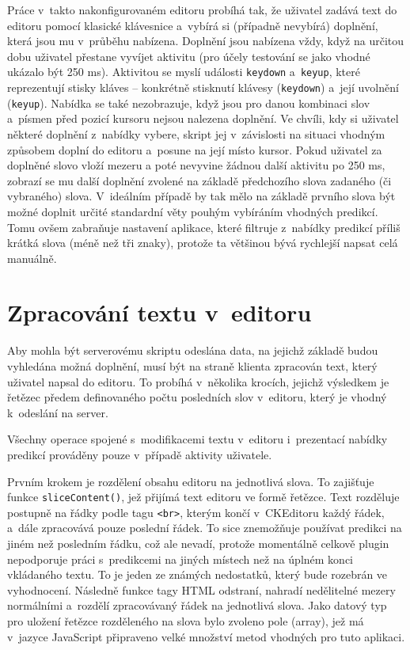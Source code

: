\documentclass[a4paper,11pt,openany]{book} %
\begin{document}
Práce v~takto nakonfigurovaném editoru probíhá tak, že uživatel zadává text do editoru pomocí klasické klávesnice a~vybírá si (případně nevybírá) doplnění, která jsou mu v~průběhu nabízena. Doplnění jsou nabízena vždy, když na určitou dobu uživatel přestane vyvíjet aktivitu (pro účely testování se jako vhodné ukázalo být 250 ms). Aktivitou se myslí události {\tt keydown} a~{\tt keyup}, které reprezentují stisky kláves -- konkrétně stisknutí klávesy ({\tt keydown}) a~její uvolnění ({\tt keyup}). Nabídka se také nezobrazuje, když jsou pro danou kombinaci slov a~písmen před pozicí kursoru nejsou nalezena doplnění. Ve chvíli, kdy si uživatel některé doplnění z~nabídky vybere, skript jej v~závislosti na situaci vhodným způsobem doplní do editoru a~posune na její místo kursor. Pokud uživatel za doplněné slovo vloží mezeru a poté nevyvine žádnou další aktivitu po 250 ms, zobrazí se mu další doplnění zvolené na základě předchozího slova zadaného (či vybraného) slova. V~ideálním případě by tak mělo na základě prvního slova být možné doplnit určité standardní věty pouhým vybíráním vhodných predikcí. Tomu ovšem zabraňuje nastavení aplikace, které filtruje z~nabídky predikcí příliš krátká slova (méně než tři znaky), protože ta většinou bývá rychlejší napsat celá manuálně.

\section{Zpracování textu v~editoru}

Aby mohla být serverovému skriptu odeslána data, na jejichž základě budou vyhledána možná doplnění, musí být na straně klienta zpracován text, který uživatel napsal do editoru. To probíhá v~několika krocích, jejichž výsledkem je řetězec předem definovaného počtu posledních slov v~editoru, který je vhodný k~odeslání na server.

Všechny operace spojené s~modifikacemi textu v~editoru i~prezentací nabídky predikcí prováděny pouze v~případě aktivity uživatele. 

Prvním krokem je rozdělení obsahu editoru na jednotlivá slova. To zajišťuje funkce {\tt sliceContent()}, jež přijímá text editoru ve formě řetězce. Text rozděluje postupně na řádky podle tagu {\tt <br>}, kterým končí v~CKEditoru každý řádek, a~dále zpracovává pouze poslední řádek. To sice znemožňuje používat predikci na jiném než posledním řádku, což ale nevadí, protože momentálně celkově plugin nepodporuje práci s~predikcemi na jiných místech než na úplném konci vkládaného textu. To je jeden ze známých nedostatků, který bude rozebrán ve vyhodnocení. Následně funkce tagy HTML odstraní, nahradí nedělitelné mezery normálními a~rozdělí zpracovávaný řádek na jednotlivá slova. Jako datový typ pro uložení řetězce rozděleného na slova bylo zvoleno pole (array), jež má v~jazyce JavaScript připraveno velké množství metod vhodných pro tuto aplikaci. 
\end{document}
